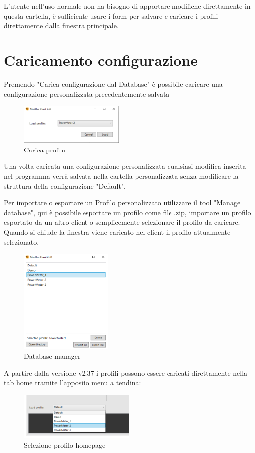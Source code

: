 L'utente nell'uso normale non ha bisogno di apportare modifiche direttamente in questa cartella, 
è sufficiente usare i form per salvare e caricare i profili direttamente dalla finestra principale.

\newpage
\section{Caricamento configurazione}

Premendo "Carica configurazione dal Database" è possibile caricare una configurazione
personalizzata precedentemente salvata:

\begin{figure}[H]
\centering
\includegraphics[width=0.45\textwidth]{../Img/LoadProfile.PNG}
\caption{Carica profilo}
\end{figure}

Una volta caricata una configurazione personalizzata qualsiasi modifica inserita nel programma
verrà salvata nella cartella personalizzata senza modificare la struttura della configurazione
"Default".

Per importare o esportare un Profilo personalizzato utilizzare il tool "Manage database",
qui è possibile esportare un profilo come file .zip, importare un profilo 
esportato da un altro client o semplicemente selezionare il profilo da caricare.
Quando si chiude la finestra viene caricato nel client 
il profilo attualmente selezionato.

\begin{figure}[H]
\centering
\includegraphics[width=0.40\textwidth]{../Img/DatabaseManager.PNG}
\caption{Database manager}
\end{figure}

A partire dalla versione v2.37 i profili possono essere caricati 
direttamente nella tab home tramite l'apposito menu a tendina:

\begin{figure}[H]
\centering
\includegraphics[width=0.50\textwidth]{../Img/ProfileHome.PNG}
\caption{Selezione profilo homepage}
\end{figure}